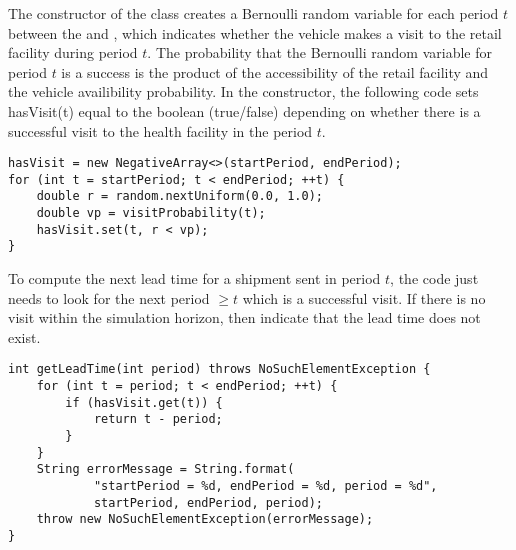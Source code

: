 The constructor of the class 
creates a Bernoulli random variable for each period $t$
between the  and ,
which indicates whether the vehicle
makes a visit to the retail facility during period $t$.
The probability that the Bernoulli random variable for period $t$ is a success
is the product of the accessibility of the retail facility
and the vehicle availibility probability.
In the constructor,
the following code sets hasVisit(t)
equal to the boolean (true/false)
depending on whether there is a successful visit to the health facility
in the period $t$.
\begin{lstlisting}
hasVisit = new NegativeArray<>(startPeriod, endPeriod);
for (int t = startPeriod; t < endPeriod; ++t) {
    double r = random.nextUniform(0.0, 1.0);
    double vp = visitProbability(t);
    hasVisit.set(t, r < vp);
}
\end{lstlisting}
To compute the next lead time for a shipment sent in period $t$,
the code just needs to look for the next period $\geq t$
which is a successful visit.
If there is no visit within the simulation horizon,
then indicate that the lead time does not exist.
\begin{lstlisting}
int getLeadTime(int period) throws NoSuchElementException {
    for (int t = period; t < endPeriod; ++t) {
        if (hasVisit.get(t)) {
            return t - period;
        }
    }
    String errorMessage = String.format(
            "startPeriod = %d, endPeriod = %d, period = %d",
            startPeriod, endPeriod, period);
    throw new NoSuchElementException(errorMessage);
}
\end{lstlisting}